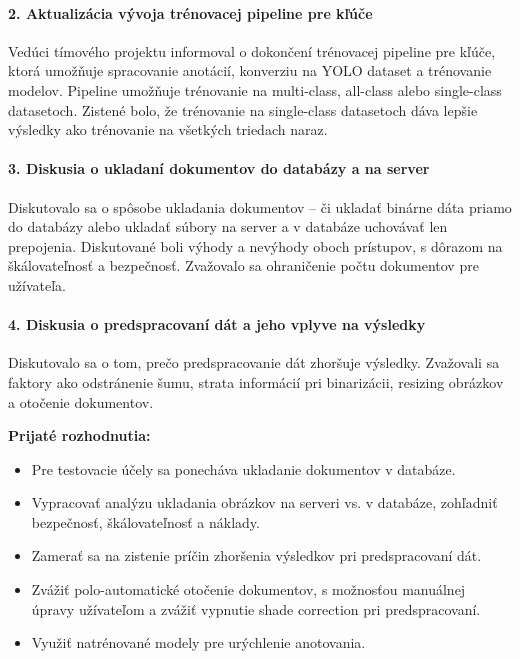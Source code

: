 \paragraph{2. Aktualizácia vývoja trénovacej pipeline pre kľúče}
Vedúci tímového projektu informoval o dokončení trénovacej pipeline pre kľúče, ktorá umožňuje spracovanie anotácií, konverziu na YOLO dataset a trénovanie modelov. Pipeline umožňuje trénovanie na multi-class, all-class alebo single-class datasetoch. Zistené bolo, že trénovanie na single-class datasetoch dáva lepšie výsledky ako trénovanie na všetkých triedach naraz.

\paragraph{3. Diskusia o ukladaní dokumentov do databázy a na server}
Diskutovalo sa o spôsobe ukladania dokumentov – či ukladať binárne dáta priamo do databázy alebo ukladať súbory na server a v databáze uchovávať len prepojenia. Diskutované boli výhody a nevýhody oboch prístupov, s dôrazom na škálovateľnosť a bezpečnosť. Zvažovalo sa ohraničenie počtu dokumentov pre užívateľa.

\paragraph{4. Diskusia o predspracovaní dát a jeho vplyve na výsledky}
Diskutovalo sa o tom, prečo predspracovanie dát zhoršuje výsledky. Zvažovali sa faktory ako odstránenie šumu, strata informácií pri binarizácii, resizing obrázkov a otočenie dokumentov.

\vspace{0.5cm}
\textbf{Prijaté rozhodnutia:}
\begin{itemize}
    \item Pre testovacie účely sa ponecháva ukladanie dokumentov v databáze.
    \item Vypracovať analýzu ukladania obrázkov na serveri vs. v databáze, zohľadniť bezpečnosť, škálovateľnosť a náklady.
    \item Zamerať sa na zistenie príčin zhoršenia výsledkov pri predspracovaní dát.
    \item Zvážiť polo-automatické otočenie dokumentov, s možnosťou manuálnej úpravy užívateľom a zvážiť vypnutie shade correction pri predspracovaní.
    \item Využiť natrénované modely pre urýchlenie anotovania.
\end{itemize}

